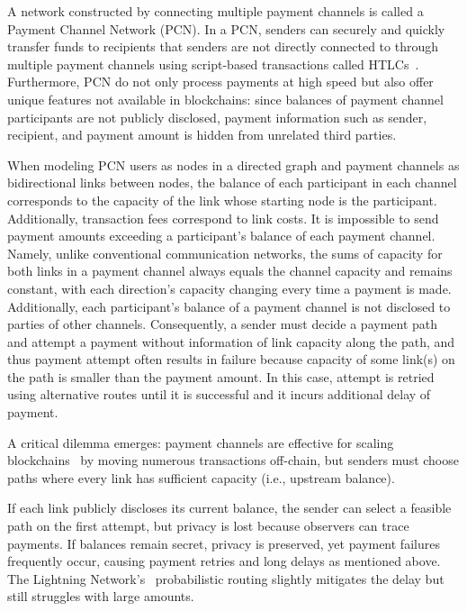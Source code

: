 \documentclass[conference]{IEEEtran}
\begin{document}
A network constructed by connecting multiple payment channels is called a Payment Channel Network (PCN).
In a PCN, senders can securely and quickly transfer funds to recipients that senders are not directly connected to through multiple payment channels using script-based transactions called HTLCs~\cite{poon_dryja_2016}.
Furthermore, PCN do not only process payments at high speed but also offer unique features not available in blockchains: since balances of payment channel participants are not publicly disclosed, payment information such as sender, recipient, and payment amount is hidden from unrelated third parties.

When modeling PCN users as nodes in a directed graph and payment channels as bidirectional links between nodes, the balance of each participant in each channel corresponds to the capacity of the link whose starting node is the participant.
Additionally, transaction fees correspond to link costs.
It is impossible to send payment amounts exceeding a participant's balance of each payment channel.
Namely, unlike conventional communication networks, the sums of capacity for both links in a payment channel always equals the channel capacity and remains constant, with each direction's capacity changing every time a payment is made.
Additionally, each participant's balance of a payment channel is not disclosed to parties of other channels.
Consequently, a sender must decide a payment path and attempt a payment without information of link capacity along the path, and thus payment attempt often results in failure because capacity of some link(s) on the path is smaller than the payment amount. In this case, attempt is retried using alternative routes until it is successful and it incurs additional delay of payment.

A critical dilemma emerges: payment channels are effective for scaling blockchains~\cite{poon_dryja_2016} by moving numerous transactions off-chain, but senders must choose paths where every link has sufficient capacity (i.e., upstream balance).

If each link publicly discloses its current balance, the sender can select a feasible path on the first attempt, but privacy is lost because observers can trace payments.
If balances remain secret, privacy is preserved, yet payment failures frequently occur, causing payment retries and long delays as mentioned above.
The Lightning Network's~\cite{lnbolt} probabilistic routing slightly mitigates the delay but still struggles with large amounts.
\end{document}
